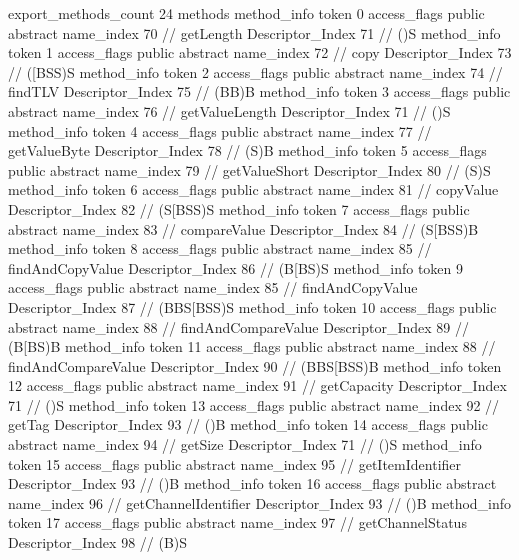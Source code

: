 {{{{			}
			export_methods_count	24
			methods {
				method_info {
					token	0
					access_flags	public abstract
					name_index	70		// getLength
					Descriptor_Index	71		// ()S
				}
				method_info {
					token	1
					access_flags	public abstract
					name_index	72		// copy
					Descriptor_Index	73		// ([BSS)S
				}
				method_info {
					token	2
					access_flags	public abstract
					name_index	74		// findTLV
					Descriptor_Index	75		// (BB)B
				}
				method_info {
					token	3
					access_flags	public abstract
					name_index	76		// getValueLength
					Descriptor_Index	71		// ()S
				}
				method_info {
					token	4
					access_flags	public abstract
					name_index	77		// getValueByte
					Descriptor_Index	78		// (S)B
				}
				method_info {
					token	5
					access_flags	public abstract
					name_index	79		// getValueShort
					Descriptor_Index	80		// (S)S
				}
				method_info {
					token	6
					access_flags	public abstract
					name_index	81		// copyValue
					Descriptor_Index	82		// (S[BSS)S
				}
				method_info {
					token	7
					access_flags	public abstract
					name_index	83		// compareValue
					Descriptor_Index	84		// (S[BSS)B
				}
				method_info {
					token	8
					access_flags	public abstract
					name_index	85		// findAndCopyValue
					Descriptor_Index	86		// (B[BS)S
				}
				method_info {
					token	9
					access_flags	public abstract
					name_index	85		// findAndCopyValue
					Descriptor_Index	87		// (BBS[BSS)S
				}
				method_info {
					token	10
					access_flags	public abstract
					name_index	88		// findAndCompareValue
					Descriptor_Index	89		// (B[BS)B
				}
				method_info {
					token	11
					access_flags	public abstract
					name_index	88		// findAndCompareValue
					Descriptor_Index	90		// (BBS[BSS)B
				}
				method_info {
					token	12
					access_flags	public abstract
					name_index	91		// getCapacity
					Descriptor_Index	71		// ()S
				}
				method_info {
					token	13
					access_flags	public abstract
					name_index	92		// getTag
					Descriptor_Index	93		// ()B
				}
				method_info {
					token	14
					access_flags	public abstract
					name_index	94		// getSize
					Descriptor_Index	71		// ()S
				}
				method_info {
					token	15
					access_flags	public abstract
					name_index	95		// getItemIdentifier
					Descriptor_Index	93		// ()B
				}
				method_info {
					token	16
					access_flags	public abstract
					name_index	96		// getChannelIdentifier
					Descriptor_Index	93		// ()B
				}
				method_info {
					token	17
					access_flags	public abstract
					name_index	97		// getChannelStatus
					Descriptor_Index	98		// (B)S
}}}}}
